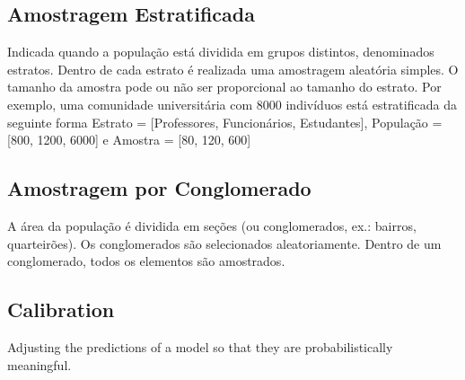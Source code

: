 \subsection{Amostragem Estratificada}
Indicada quando a população está dividida em grupos distintos, denominados estratos. Dentro de cada estrato é realizada uma amostragem aleatória simples. O tamanho da amostra pode ou não ser proporcional ao tamanho do estrato. Por exemplo, uma comunidade universitária com 8000 indivíduos está estratificada da seguinte forma Estrato = [Professores, Funcionários, Estudantes], População = [800, 1200, 6000] e Amostra = [80, 120, 600]
    
\subsection{Amostragem por Conglomerado}
A área da população é dividida em seções (ou conglomerados, ex.: bairros, quarteirões). Os conglomerados são selecionados aleatoriamente. Dentro de um conglomerado, todos os elementos são amostrados.


\subsection{Calibration}
Adjusting the predictions of a model so that they are probabilistically meaningful.
